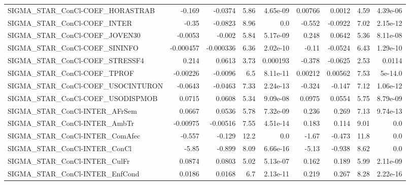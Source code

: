\begin{tabular}{lrrrrrrrr}
SIGMA\_STAR\_ConCl-COEF\_HORASTRAB        &      -0.169 &      -0.0374 &     5.86 & 4.65e-09 &    0.00766 &      0.0012 &         4.59 &      4.39e-06 \\
SIGMA\_STAR\_ConCl-COEF\_INTER            &       -0.35 &      -0.0823 &     8.96 &      0.0 &     -0.552 &     -0.0922 &         7.02 &      2.15e-12 \\
SIGMA\_STAR\_ConCl-COEF\_JOVEN30          &     -0.0053 &       -0.002 &     5.84 & 5.17e-09 &      0.248 &      0.0642 &         5.36 &      8.11e-08 \\
SIGMA\_STAR\_ConCl-COEF\_SININFO          &   -0.000457 &    -0.000336 &     6.36 & 2.02e-10 &      -0.11 &     -0.0524 &         6.43 &      1.29e-10 \\
SIGMA\_STAR\_ConCl-COEF\_STRESSF4         &       0.214 &       0.0613 &     3.73 & 0.000193 &     -0.378 &     -0.0625 &         2.53 &        0.0114 \\
SIGMA\_STAR\_ConCl-COEF\_TPROF            &    -0.00226 &      -0.0096 &      6.5 & 8.11e-11 &    0.00212 &     0.00562 &         7.53 &       5e-14.0 \\
SIGMA\_STAR\_ConCl-COEF\_USOCINTURON      &     -0.0643 &      -0.0463 &     7.33 & 2.24e-13 &     -0.324 &      -0.147 &         7.12 &      1.06e-12 \\
SIGMA\_STAR\_ConCl-COEF\_USODISPMOB       &      0.0715 &       0.0608 &     5.34 & 9.09e-08 &     0.0975 &      0.0554 &         5.75 &      8.79e-09 \\
SIGMA\_STAR\_ConCl-INTER\_AFrSem          &      0.0667 &       0.0536 &     5.78 & 7.32e-09 &      0.236 &       0.269 &         7.13 &      9.74e-13 \\
SIGMA\_STAR\_ConCl-INTER\_AmbTr           &    -0.00975 &     -0.00516 &     7.55 & 4.51e-14 &      0.183 &       0.114 &         9.01 &           0.0 \\
SIGMA\_STAR\_ConCl-INTER\_ComAfec         &      -0.557 &       -0.129 &     12.2 &      0.0 &      -1.67 &      -0.473 &         11.8 &           0.0 \\
SIGMA\_STAR\_ConCl-INTER\_ConCl           &       -5.85 &       -0.899 &     8.09 & 6.66e-16 &      -5.13 &      -0.938 &         8.62 &           0.0 \\
SIGMA\_STAR\_ConCl-INTER\_CulFr           &      0.0874 &       0.0803 &     5.02 & 5.13e-07 &      0.162 &       0.189 &         5.99 &      2.11e-09 \\
SIGMA\_STAR\_ConCl-INTER\_EnfCond         &      0.0186 &       0.0168 &      6.7 & 2.13e-11 &      0.219 &       0.267 &         8.28 &      2.22e-16 \\

\end{tabular}
